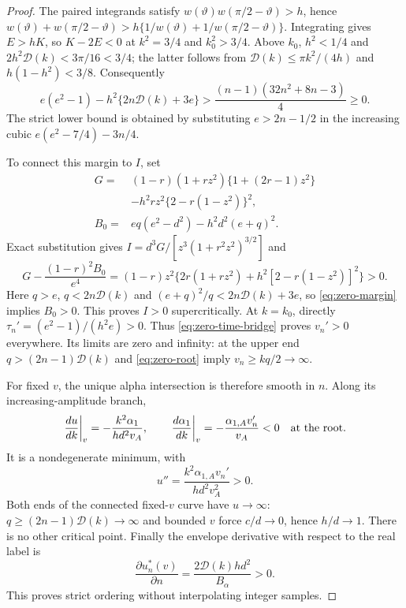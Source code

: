 \documentclass[11pt,a4paper]{article}
\theoremstyle{remark}\newtheorem{remark}[theorem]{Remark}
\begin{document}
\begin{proof}
The paired integrands satisfy
$w(\vartheta)w(\pi/2-\vartheta)>h$, hence
$w(\vartheta)+w(\pi/2-\vartheta)>
h\{1/w(\vartheta)+1/w(\pi/2-\vartheta)\}$. Integrating gives $E>hK$,
so $K-2E<0$ at $k^2=3/4$ and $k_0^2>3/4$.
Above $k_0$, $h^2<1/4$ and $2h^2\mathcal D(k)<3\pi/16<3/4$;
the latter follows from $\mathcal D(k)\le\pi k^2/(4h)$ and
$h(1-h^2)<3/8$. Consequently
\begin{equation}\label{eq:zero-margin}
 e(e^2-1)-h^2\{2n\mathcal D(k)+3e\}
 >\frac{(n-1)(32n^2+8n-3)}4\ge0 .
\end{equation}
The strict lower bound is obtained by substituting $e>2n-1/2$
in the increasing cubic $e(e^2-7/4)-3n/4$.

To connect this margin to $I$, set
\[
 \begin{split}
 G={}&(1-r)(1+rz^2)\{1+(2r-1)z^2\}\\
     &-h^2rz^2\{2-r(1-z^2)\}^2,\\
 B_0={}&eq(e^2-d^2)-h^2d^2(e+q)^2.
 \end{split}
\]
Exact substitution gives $I=d^3G/[z^3(1+r^2z^2)^{3/2}]$ and
\[
 G-\frac{(1-r)^2B_0}{e^4}
 =(1-r)z^2\{2r(1+rz^2)+h^2[2-r(1-z^2)]^2\}>0 .
\]
Here $q>e$, $q<2n\mathcal D(k)$ and
$(e+q)^2/q<2n\mathcal D(k)+3e$, so \eqref{eq:zero-margin}
implies $B_0>0$. This proves $I>0$ supercritically.
At $k=k_0$, directly $\tau_n'=(e^2-1)/(h^2e)>0$.
Thus \eqref{eq:zero-time-bridge} proves $v_n'>0$ everywhere.
Its limits are zero and infinity: at the upper end
$q>(2n-1)\mathcal D(k)$ and \eqref{eq:zero-root} imply
$v_n\ge kq/2\to\infty$.

For fixed $v$, the unique alpha intersection is therefore smooth in $n$.
Along its increasing-amplitude branch,
\[
 \left.\frac{du}{dk}\right|_v=-\frac{k^2\alpha_1}{hd^2v_A},
 \qquad
 \left.\frac{d\alpha_1}{dk}\right|_v
       =-\frac{\alpha_{1,A}v_n'}{v_A}<0
 \quad\hbox{at the root}.
\]
It is a nondegenerate minimum, with
\begin{equation}\label{eq:zero-curvature}
 u''=\frac{k^2\alpha_{1,A}v_n'}{hd^2v_A^2}>0 .
\end{equation}
Both ends of the connected fixed-$v$ curve have $u\to\infty$:
$q\ge(2n-1)\mathcal D(k)\to\infty$ and bounded $v$ force
$c/d\to0$, hence $h/d\to1$. There is no other critical point.
Finally the envelope derivative with respect to the real label is
\begin{equation}\label{eq:zero-label}
 \frac{\partial u_n^*(v)}{\partial n}
      =\frac{2\mathcal D(k)h d^2}{B_\alpha}>0 .
\end{equation}
This proves strict ordering without interpolating integer samples.
\end{proof}
\end{document}
